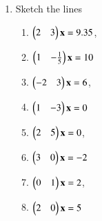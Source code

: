 \renewcommand{\theequation}{\theenumi}
\begin{enumerate}[label=\arabic*.,ref=\thesubsection.\theenumi]

\item Sketch the lines
\begin{enumerate}
	\item $\begin{pmatrix}2 & 3\end{pmatrix}\mathbf x = 9.35$,	 \item $\begin{pmatrix}1 & -\frac{1}{5}\end{pmatrix}\mathbf x = 10$
	\item $\begin{pmatrix}-2 & 3\end{pmatrix}\mathbf x = 6$,  \item $\begin{pmatrix}1 & -3\end{pmatrix}\mathbf x = 0$
	\item $\begin{pmatrix}2 & 5\end{pmatrix}\mathbf x = 0$,  \item $\begin{pmatrix}3 & 0\end{pmatrix}\mathbf x = -2$
	\item $\begin{pmatrix}0 & 1\end{pmatrix}\mathbf x = 2$,  \item $\begin{pmatrix}2 & 0\end{pmatrix}\mathbf x = 5$	 
\end{enumerate}
\end{enumerate}